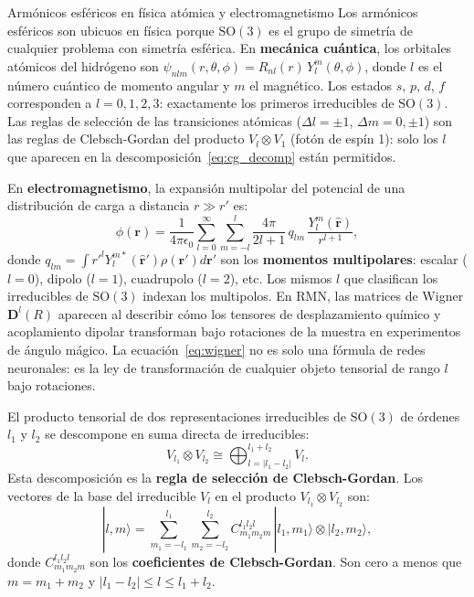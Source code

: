 \begin{fisicaconexion}{Armónicos esféricos en física atómica y electromagnetismo}
Los armónicos esféricos son ubicuos en física porque $\mathrm{SO}(3)$ es el
grupo de simetría de cualquier problema con simetría esférica. En
\textbf{mecánica cuántica}, los orbitales atómicos del hidrógeno son
$\psi_{nlm}(r,\theta,\phi) = R_{nl}(r)\,Y_l^m(\theta,\phi)$, donde $l$ es el
número cuántico de momento angular y $m$ el magnético. Los estados $s$, $p$,
$d$, $f$ corresponden a $l = 0, 1, 2, 3$: exactamente los primeros irreducibles
de $\mathrm{SO}(3)$. Las reglas de selección de las transiciones atómicas
($\Delta l = \pm 1$, $\Delta m = 0, \pm 1$) son las reglas de Clebsch-Gordan
del producto $V_l \otimes V_1$ (fotón de espín 1): solo los $l$ que aparecen
en la descomposición~\eqref{eq:cg_decomp} están permitidos.

En \textbf{electromagnetismo}, la expansión multipolar del potencial de una
distribución de carga a distancia $r \gg r'$ es:
\[
  \phi(\bm{r}) = \frac{1}{4\pi\epsilon_0}\sum_{l=0}^\infty \sum_{m=-l}^l
  \frac{4\pi}{2l+1}\,q_{lm}\,\frac{Y_l^m(\hat{\bm{r}})}{r^{l+1}},
\]
donde $q_{lm} = \int r'^l Y_l^{m*}(\hat{\bm{r}}')\rho(\bm{r}')d\bm{r}'$ son
los \textbf{momentos multipolares}: escalar ($l=0$), dipolo ($l=1$), cuadrupolo
($l=2$), etc. Los mismos $l$ que clasifican los irreducibles de $\mathrm{SO}(3)$
indexan los multipolos. En RMN, las matrices de Wigner $\bm{D}^l(R)$
aparecen al describir cómo los tensores de desplazamiento químico y acoplamiento
dipolar transforman bajo rotaciones de la muestra en experimentos de ángulo
mágico. La ecuación~\eqref{eq:wigner} no es solo una fórmula de redes neuronales:
es la ley de transformación de cualquier objeto tensorial de rango $l$ bajo
rotaciones.
\end{fisicaconexion}
\label{subsec:cg}

El producto tensorial de dos representaciones irreducibles de $\mathrm{SO}(3)$
de órdenes $l_1$ y $l_2$ se descompone en suma directa de irreducibles:
\begin{equation}
  V_{l_1} \otimes V_{l_2} \cong \bigoplus_{l=|l_1-l_2|}^{l_1+l_2} V_l.
  \label{eq:cg_decomp}
\end{equation}
Esta descomposición es la \textbf{regla de selección de Clebsch-Gordan}.
Los vectores de la base del irreducible $V_l$ en el producto $V_{l_1}\otimes V_{l_2}$
son:
\begin{equation}
  |l, m\rangle = \sum_{m_1=-l_1}^{l_1} \sum_{m_2=-l_2}^{l_2}
  C_{m_1 m_2 m}^{l_1 l_2 l}\,|l_1, m_1\rangle \otimes |l_2, m_2\rangle,
  \label{eq:cg_vector}
\end{equation}
donde $C_{m_1 m_2 m}^{l_1 l_2 l}$ son los \textbf{coeficientes de Clebsch-Gordan}.
Son cero a menos que $m = m_1+m_2$ y $|l_1-l_2| \leq l \leq l_1+l_2$.

